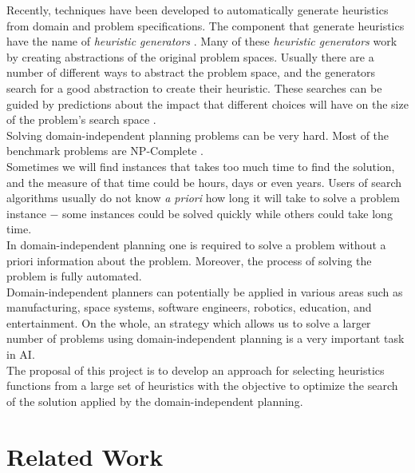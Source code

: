\documentclass[a4paper,12pt]{article}
\begin{document}
Recently, techniques \citep{haslum2007domain, edelkamp2007automated, nissim2011computing}  have been developed to automatically generate heuristics from domain and problem specifications. The component that generate heuristics have the name of \textit{heuristic generators} \citep{BarleySantiagoOver}.  Many of these \textit{heuristic generators} work by creating abstractions of the original problem spaces. Usually there are a number of different ways to abstract the problem space, and the generators search for a good abstraction to create their heuristic. These searches can be guided by predictions about the impact that different choices will have on the size of the problem's search space \citep{haslum2007domain}.\\

Solving domain-independent planning problems can be very hard. Most of the benchmark problems are NP-Complete \citep{helmert2006fast}.\\

Sometimes we will find instances that takes too much time to find the solution, and the measure of that time could be hours, days or even years. Users of search algorithms usually do not know \textit{a priori} how long it will take to solve a problem instance $-$ some instances could be solved quickly while others could take long time.\\

In domain-independent planning one is required to solve a problem without a priori information about the problem. Moreover, the process of solving the problem is fully automated.\\

Domain-independent planners can potentially be applied in various areas such as manufacturing, space systems, software engineers, robotics, education, and entertainment. On the whole, an strategy which allows us to solve a larger number of problems using domain-independent planning is a very important task in AI.\\

The proposal of this project is to develop an approach for selecting heuristics functions from a large set of heuristics with the objective to optimize the search of the solution applied by the domain-independent planning.

\section{Related Work}
\end{document}
